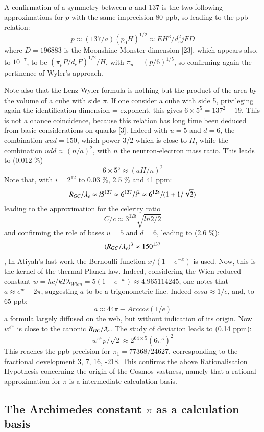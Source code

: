 \documentclass[twoside,draft]{article}
\begin{document}
\begin{sloppypar}
{A confirmation of a symmetry between $a$ and 137 is the two following approximations for $p$ with the same imprecision 80 ppb, so leading to the ppb relation:
 $$p \approx (137/a) (p_0 H)^{1/2}  \approx EH^3/d_e^2jFD $$ 
where $D = 196883$ is the Moonshine Monster dimension [23], which appears also, to $10^{-7}$, to be $(\pi_p P/d_eF)^{1/2}/H$, with $\pi_p = (p/6)^{1/5}$, so confirming again the pertinence of Wyler's approach. 

Note also that the Lenz-Wyler formula is nothing but the product of the area by the volume of a cube with side $\pi $. If one consider a cube with side 5, privileging again the identification dimension = exponent, this gives $6 \times 5^5 = 137^2 - 19 $. This is not a chance coincidence, because this relation has long time been deduced from basic considerations on quarks [3]. Indeed with $u = 5 $ and $d = 6 $, the combination $uud = 150 $, which power 3/2 which is close to $H$, while the combination $udd \approx (n/a)^2 $, with $n$ the neutron-electron mass ratio. This leads to (0.012 \%) $$6\times 5^5 \approx (aH/n)^2 $$  
Note that, with $i = 2^{12}$ to 0.03 \%, 2.5 \% and 41 ppm:
$$R_{GC}/\lambdabar_e \approx i5^{137} \approx 6^{137}/i^2 \approx 6^{128}/(1+1/\sqrt2)$$
leading to the approximation for the celerity ratio $$ C/c\approx3^{128} \sqrt{ln2/2}$$ and confirming the role of bases $u = 5$ and $d = 6$, leading to (2.6 \%):
$$(R_{GC}/\lambdabar_e)^3 \approx 150^{137}$$,
 In Atiyah's last work the Bernoulli function $x/(1-e^{-x})$ is used. Now, this is the kernel of the thermal Planck law. Indeed, considering the Wien reduced constant $w = hc/kT\lambda_{Wien} = 5 (1-e^{-w}) \approx 4.965114245$, one notes that $a \approx e^w -2\pi$, suggesting $a$ to be a trigonometric line. Indeed $cosa \approx 1/e$, and, to 65 ppb:
\begin{equation}
a \approx 44\pi - Arccos(1/e)
\end{equation}
a formula largely diffused on the web, but without indication of its origin. Now $w^{e^w}$ is close to the canonic $R_{GC}/\lambdabar_e$. The study of deviation leads to (0.14 ppm):
$$w^{e^w} p/\sqrt2 \approx 2^{64\times5} (6\pi^5)^2$$
This reaches the ppb precision for $\pi_1 = 77368/24627$, corresponding to the fractional development 3, 7, 16, -218. This confirms the above Rationalisation Hypothesis concerning the origin of the Cosmos vastness, namely
that a rational approximation for $\pi$ is a intermediate calculation basis. 

\subsection {The Archimedes constant $\pi$ as a calculation basis}

}
\end{sloppypar}
\end{document}
